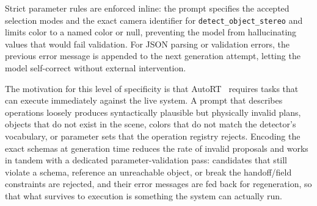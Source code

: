 \documentclass[
     12pt,
     a4paper,
     BCOR=10mm,
     DIV=14,
     listof=totoc,
     bibliography=totoc,
     parskip,
     twoside,
     headsepline
     ]{scrreprt}
\begin{document}
Strict parameter rules are enforced inline: the prompt specifies the accepted selection modes and the exact camera identifier for \texttt{detect\_object\_stereo} and limits color to a named color or null, preventing the model from hallucinating values that would fail validation. For JSON parsing or validation errors, the previous error message is appended to the next generation attempt, letting the model self-correct without external intervention.

The motivation for this level of specificity is that AutoRT~\cite{ahn2024autortembodiedfoundationmodels} requires tasks that can execute immediately against the live system. A prompt that describes operations loosely produces syntactically plausible but physically invalid plans, objects that do not exist in the scene, colors that do not match the detector's vocabulary, or parameter sets that the operation registry rejects. Encoding the exact schemas at generation time reduces the rate of invalid proposals and works in tandem with a dedicated parameter-validation pass: candidates that still violate a schema, reference an unreachable object, or break the handoff/field constraints are rejected, and their error messages are fed back for regeneration, so that what survives to execution is something the system can actually run.
\end{document}
